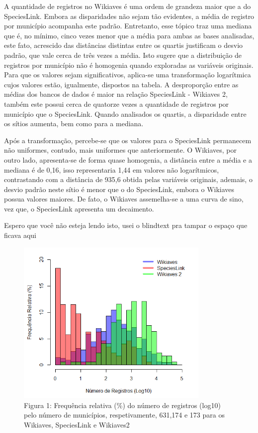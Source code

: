 \documentclass[12pt]{extarticle}
\newenvironment{resposta}{ \color{mygray}}{}
\begin{document}
\begin{resposta}
A quantidade de registros no Wikiaves é uma ordem de grandeza maior que a do SpeciesLink. Embora as disparidades não sejam tão evidentes, a média de registro por município acompanha este padrão. Entretanto, esse tópico traz uma mediana que é, no mínimo, cinco vezes menor que a média para ambas as bases analisadas, este fato, acrescido das distâncias distintas entre os quartis justificam o desvio padrão, que vale cerca de três vezes a média. Isto sugere que a distribuição de registros por município não é homogenia quando exploradas as variáveis originais. Para que os valores sejam significativos, aplica-se uma transformação logarítmica cujos valores estão, igualmente, dispostos na tabela. A desproporção entre as médias dos bancos de dados é maior na relação SpeciesLink - Wikiaves 2, também este possui cerca de quatorze vezes a quantidade de registros por município que o SpeciesLink. Quando analisados os quartis, a disparidade entre os sítios aumenta, bem como para a mediana. 

Após a transformação, percebe-se que os valores para o SpeciesLink permanecem não uniformes, contudo, mais uniformes que anteriormente. O Wikiaves, por outro lado, apresenta-se de forma quase homogenia, a distância entre a média e a mediana é de 0,16, isso representaria 1,44 em valores não logarítmicos, contrastando com a distância de 935,6 obtida pelas variáveis originais, ademais, o desvio padrão neste sítio é menor que o do SpeciesLink, embora o Wikiaves possua valores maiores. De fato, o Wikiaves assemelha-se a uma curva de sino, vez que, o SpeciesLink apresenta um decaimento.

Espero que você não esteja lendo isto, usei o blindtext pra tampar o espaço que ficava aqui \blindtext 

\end{resposta}

\newpage

\begin{figure}[h!]
\centering
\includegraphics[height = 8cm]{Imagens/H01.png}
\\{\scriptsize Figura 1: Frequência relativa (\%) do número de registros (log10) pelo número de municípios, respetivamente, 631,174 e 173 para os Wikiaves, SpeciesLink e Wikiaves2  }
\end{figure}
\end{document}
